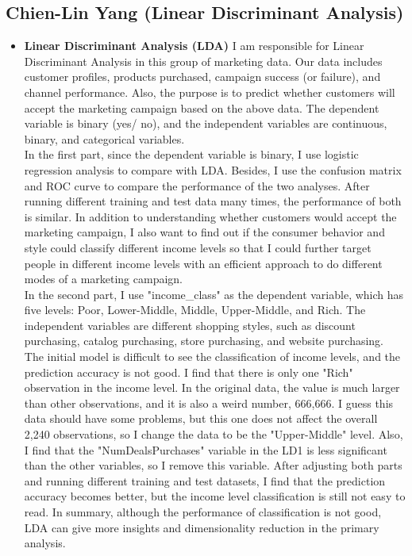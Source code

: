 \documentclass[11pt]{article} %
\begin{document}
\subsection{Chien-Lin Yang (Linear Discriminant Analysis)}
\begin{itemize}
\item \textbf{Linear Discriminant Analysis (LDA)}
\newline
I am responsible for Linear Discriminant Analysis in this group of marketing data. Our data includes customer profiles, products purchased, campaign success (or failure), and channel performance. Also, the purpose is to predict whether customers will accept the marketing campaign based on the above data. The dependent variable is binary (yes/ no), and the independent variables are continuous, binary, and categorical variables.
\\
In the first part, since the dependent variable is binary, I use logistic regression analysis to compare with LDA. Besides, I use the confusion matrix and ROC curve to compare the performance of the two analyses. After running different training and test data many times, the performance of both is similar. In addition to understanding whether customers would accept the marketing campaign, I also want to find out if the consumer behavior and style could classify different income levels so that I could further target people in different income levels with an efficient approach to do different modes of a marketing campaign.
\\
In the second part, I use "income\_class" as the dependent variable, which has five levels: Poor, Lower-Middle, Middle, Upper-Middle, and Rich. The independent variables are different shopping styles, such as discount purchasing, catalog purchasing, store purchasing, and website purchasing.　The initial model is difficult to see the classification of income levels, and the prediction accuracy is not good. I find that there is only one "Rich" observation in the income level. In the original data, the value is much larger than other observations, and it is also a weird number, 666,666. I guess this data should have some problems, but this one does not affect the overall 2,240 observations, so I change the data to be the "Upper-Middle" level. Also, I find that the "NumDealsPurchases" variable in the LD1 is less significant than the other variables, so I remove this variable. After adjusting both parts and running different training and test datasets, I find that the prediction accuracy becomes better, but the income level classification is still not easy to read. In summary, although the performance of classification is not good, LDA can give more insights and dimensionality reduction in the primary analysis.

\end{itemize}
\end{document}
